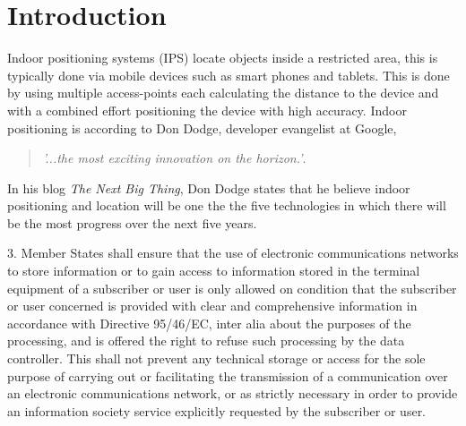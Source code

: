 \chapter{Introduction}
Indoor positioning systems (IPS) locate objects inside a restricted area, this is typically done via mobile devices such as smart phones and tablets. This is done by using multiple access-points each calculating the distance to the device and with a combined effort positioning the device with high accuracy\cite{WhatIsIPS}. 
Indoor positioning is according to Don Dodge, developer evangelist at Google, 
\begin{quotation}
	\textit{'...the most exciting innovation on the horizon.'}\cite{DonDNextBigThing}.
\end{quotation}

In his blog \textit{The Next Big Thing}, Don Dodge states that he believe indoor positioning and location will be one the the five technologies in which there will be the most progress over the next five years\cite{DonDIndoorIsNext}.


3. Member States shall ensure that the use of electronic communications networks to store information or to gain access to information stored in the terminal equipment of a subscriber or user is only allowed on condition that the subscriber or user concerned is provided with clear and comprehensive information in accordance with Directive 95/46/EC, inter alia about the purposes of the processing, and is offered the right to refuse such processing by the data controller. This shall not prevent any technical storage or access for the sole purpose of carrying out or facilitating the transmission of a communication over an electronic communications network, or as strictly necessary in order to provide an information society service explicitly requested by the subscriber or user.

